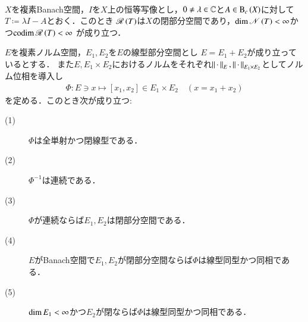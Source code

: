 	\begin{screen}
		\begin{thm}\mbox{}\\
			$X$を複素Banach空間，$I$を$X$上の恒等写像とし，$0 \neq \lambda \in \mathbb{C}$と$A \in \mathrm{B}_c\left(X\right) $に対して
			$T \coloneqq \lambda I - A$とおく．このとき
			$\mathscr{R}\left( T \right)$は$X$の閉部分空間であり，$\operatorname{dim} \mathscr{N}\left( T \right) < \infty$かつ$\operatorname{codim} \mathscr{R}\left( T \right) < \infty$\footnotemark
			が成り立つ．
		\end{thm}
	\end{screen}
	\footnotetext{
		$\Codim{\Ran{T}} = \Dim{X/\Ran{T}}$である．
	}
	\begin{screen}
		\begin{thm}[Fredholmの交代定理]
			
		\end{thm}
	\end{screen}
	
	\begin{screen}
		\begin{lem}
			$E$を複素ノルム空間，$E_1,E_2$を$E$の線型部分空間とし
			$E = E_1 + E_2$が成り立っているとする\footnotemark．
			また$E,E_1 \times E_2$におけるノルムをそれぞれ$\left\|\, \cdot\, \right\|_{E},\left\|\, \cdot\, \right\|_{E_1 \times E_2}$としてノルム位相を導入し
			\begin{align}
				\Phi:E \ni x \longmapsto [x_1,x_2] \in E_1 \times E_2
				\quad (x = x_1 + x_2)
			\end{align}
			を定める．このとき次が成り立つ:
			\begin{description}
				\item[(1)] $\Phi$は全単射かつ閉線型である．
				\item[(2)] $\Phi^{-1}$は連続である．
				\item[(3)] $\Phi$が連続ならば$E_1,E_2$は閉部分空間である．
				\item[(4)] $E$がBanach空間で$E_1,E_2$が閉部分空間ならば$\Phi$は線型同型かつ同相である．
				\item[(5)] $\operatorname{dim} E_1 < \infty$かつ$E_2$が閉ならば$\Phi$は線型同型かつ同相である．
			\end{description}
		\end{lem}
	\end{screen}
	
	
